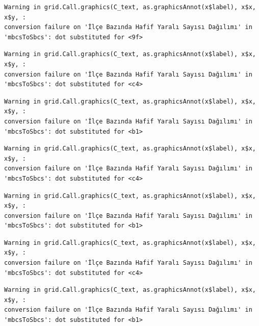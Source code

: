 \documentclass[
  11pt,
  a4paper,
  DIV=11,
  numbers=noendperiod]{scrartcl}
\begin{document}
\begin{verbatim}
Warning in grid.Call.graphics(C_text, as.graphicsAnnot(x$label), x$x, x$y, :
conversion failure on 'İlçe Bazında Hafif Yaralı Sayısı Dağılımı' in
'mbcsToSbcs': dot substituted for <9f>
\end{verbatim}

\begin{verbatim}
Warning in grid.Call.graphics(C_text, as.graphicsAnnot(x$label), x$x, x$y, :
conversion failure on 'İlçe Bazında Hafif Yaralı Sayısı Dağılımı' in
'mbcsToSbcs': dot substituted for <c4>
\end{verbatim}

\begin{verbatim}
Warning in grid.Call.graphics(C_text, as.graphicsAnnot(x$label), x$x, x$y, :
conversion failure on 'İlçe Bazında Hafif Yaralı Sayısı Dağılımı' in
'mbcsToSbcs': dot substituted for <b1>
\end{verbatim}

\begin{verbatim}
Warning in grid.Call.graphics(C_text, as.graphicsAnnot(x$label), x$x, x$y, :
conversion failure on 'İlçe Bazında Hafif Yaralı Sayısı Dağılımı' in
'mbcsToSbcs': dot substituted for <c4>
\end{verbatim}

\begin{verbatim}
Warning in grid.Call.graphics(C_text, as.graphicsAnnot(x$label), x$x, x$y, :
conversion failure on 'İlçe Bazında Hafif Yaralı Sayısı Dağılımı' in
'mbcsToSbcs': dot substituted for <b1>
\end{verbatim}

\begin{verbatim}
Warning in grid.Call.graphics(C_text, as.graphicsAnnot(x$label), x$x, x$y, :
conversion failure on 'İlçe Bazında Hafif Yaralı Sayısı Dağılımı' in
'mbcsToSbcs': dot substituted for <c4>
\end{verbatim}

\begin{verbatim}
Warning in grid.Call.graphics(C_text, as.graphicsAnnot(x$label), x$x, x$y, :
conversion failure on 'İlçe Bazında Hafif Yaralı Sayısı Dağılımı' in
'mbcsToSbcs': dot substituted for <b1>
\end{verbatim}
\end{document}
